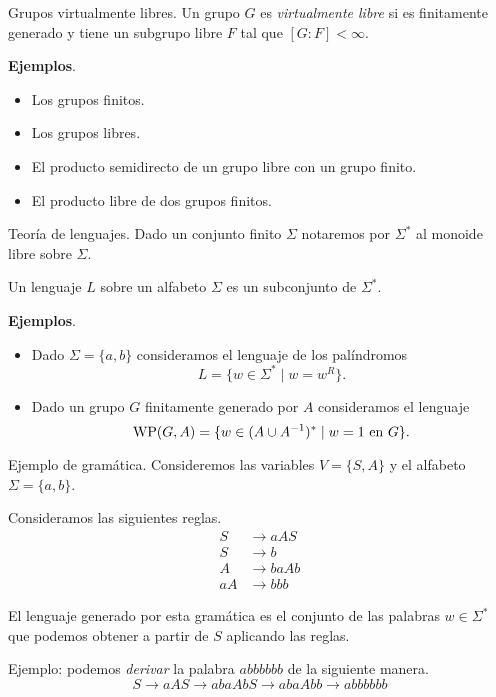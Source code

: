 \documentclass[aspectratio=169, 10pt]{beamer}
\begin{document}
	\begin{frame}[fragile]{Grupos virtualmente libres.}
		Un grupo $G$ es \emph{virtualmente libre} si es finitamente generado y
		tiene un subgrupo libre $F$ tal que $[G:F] < \infty$.

		\textbf{Ejemplos}.

			\begin{itemize}
				\item Los grupos finitos.
				\item Los grupos libres.
				\item El producto semidirecto de un grupo libre con un grupo finito.
				\item El producto libre de dos grupos finitos.
			\end{itemize}
	\end{frame}

	\begin{frame}[fragile]{Teoría de lenguajes.}
		Dado un conjunto finito $\Sigma$ notaremos por $\Sigma^*$ al monoide libre sobre $\Sigma$.
		
		
			Un lenguaje $L$ sobre un alfabeto $\Sigma$ es un subconjunto de $\Sigma^*$.
			
		
			\textbf{Ejemplos}.


			\begin{itemize}
				\item 
					Dado $\Sigma = \{a,b\}$ consideramos el lenguaje de los palíndromos
					\[
						L = \{ w \in \Sigma^{*} \mid w = w^{R}  \}.
					\]
				\item 
					Dado un grupo $G$ finitamente generado por $A$ consideramos el lenguaje
					\[
						\text{WP}(G, A) = \{ w \in (A \cup A^{-1})^{*} \mid w = 1 \ \text{en $G$} \}.	
					\]
			\end{itemize}
	\end{frame}
	
	\begin{frame}[fragile]{Ejemplo de gramática.}
		Consideremos las variables $V =\{ S,A \}$ y el alfabeto $\Sigma = \{ a,b \}$.

		Consideramos las siguientes reglas.
		\begin{align*}
			S  & \to aAS  \\
			S  & \to b    \\
			A  & \to baAb \\
			aA & \to bbb
		\end{align*}

		El lenguaje generado por esta gramática es el conjunto de las palabras $w \in \Sigma^{*}$ que podemos obtener a partir de $S$ aplicando las reglas.

		Ejemplo: podemos \emph{derivar} la palabra $abbbbbb$ de la siguiente manera.  
		\[
			S \to aAS \to abaAbS \to abaAbb \to abbbbbb	
		\]
	\end{frame}
\end{document}
